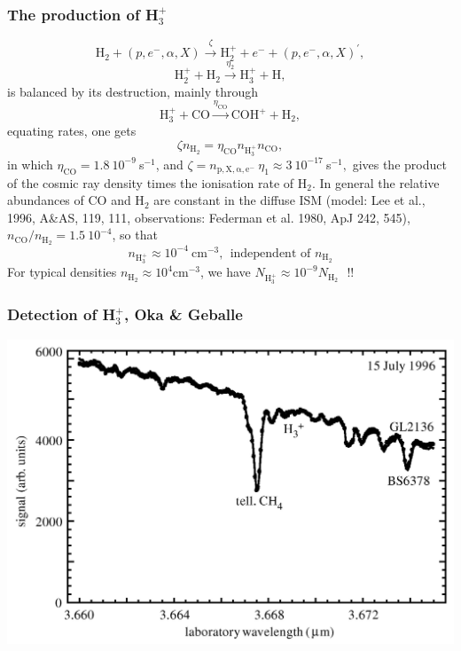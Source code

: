 \begin{frame}\frametitle{The production of  H$_3^+$}

 
\[ \mathrm{H}_2 + (p,e^-,\alpha,X) \stackrel{\zeta}{\rightarrow}
\mathrm{H}_2^+ + e^- +  (p,e^-,\alpha,X)^\prime, \]
\[\mathrm{H}_2^+ +   \mathrm{H}_2 \stackrel{\eta_2} {\rightarrow} \mathrm{H}_3^+ + \mathrm{H},\]
is balanced by its destruction, mainly through
\[ \mathrm{H}_3^+ + \mathrm{CO} \stackrel{\eta_\mathrm{CO}}{ \rightarrow} \mathrm{COH^+} +
\mathrm{H}_2, \]
equating rates, one gets
\[  \zeta n_\mathrm{H_2} = \eta_\mathrm{CO} n_\mathrm{H_3^+}
n_\mathrm{CO} ,\] in which $\eta_\mathrm{CO} = 1.8~10^{-9}~$s$^{-1}$,
and $\zeta = n_\mathrm{p,X,\alpha,e^{-}} ~\eta_1 \approx
3~10^{-17}~$s$^{-1},$ gives the product of the cosmic ray density
times the ionisation rate of H$_2$. In general the relative abundances
of CO and H$_2$ are constant in the diffuse ISM (model: Lee et al.,
1996, A\&AS, 119, 111, observations: Federman et al. 1980, ApJ 242,
545), $n_\mathrm{CO}/n_\mathrm{H_2} = 1.5~10^{-4}$, so that
\[ \boxed{ n_\mathrm{H_3^+}  \approx 10^{-4}~\mathrm{cm^{-3}}, ~~\text{independent of $n_\mathrm{H_2}$}} \]
For typical densities  $n_\mathrm{H_2} \approx 10^{4}
\mathrm{cm^{-3}}$, we have $N_{\mathrm{H}_3^+} \approx 10^{-9} N_{\mathrm{H}_2}~~~ \text{!!}$





\end{frame} \begin{frame}\frametitle{Detection of H$_3^+$, Oka \& Geballe }
\begin{center}
  \includegraphics[width=\textwidth,height=!]{./B/h3_rawspec.jpg}
\end{center}


\end{frame}

